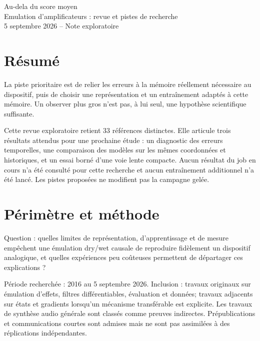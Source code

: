 \documentclass[10pt,a4paper]{article}
\begin{document}
\begin{center}\Large Au-dela du score moyen\\
\large Emulation d'amplificateurs : revue et pistes de recherche\\
\normalsize 5 septembre 2026 -- Note exploratoire\end{center}
\tableofcontents
\newpage


\section{R\'{e}sum\'{e}}

La piste prioritaire est de relier les erreurs \`{a} la m\'{e}moire r\'{e}ellement n\'{e}cessaire au dispositif,
puis de choisir une repr\'{e}sentation et un entra\^{i}nement adapt\'{e}s \`{a} cette m\'{e}moire.
Un observer plus gros n'est pas, \`{a} lui seul, une hypoth\`{e}se scientifique suffisante.

Cette revue exploratoire retient 33 r\'{e}f\'{e}rences distinctes. Elle articule trois r\'{e}sultats attendus
pour une prochaine \'{e}tude : un diagnostic des erreurs temporelles, une comparaison des mod\`{e}les sur
les m\^{e}mes coordonn\'{e}es et historiques, et un essai born\'{e} d'une voie lente compacte.
Aucun r\'{e}sultat du job en cours n'a \'{e}t\'{e} consult\'{e} pour cette recherche et aucun entra\^{i}nement additionnel
n'a \'{e}t\'{e} lanc\'{e}. Les pistes propos\'{e}es ne modifient pas la campagne gel\'{e}e.

\section{P\'{e}rim\`{e}tre et m\'{e}thode}

Question : quelles limites de repr\'{e}sentation, d'apprentissage et de mesure emp\^{e}chent une \'{e}mulation
dry/wet causale de reproduire fid\`{e}lement un dispositif analogique, et quelles exp\'{e}riences peu
co\^{u}teuses permettent de d\'{e}partager ces explications ?

P\'{e}riode recherch\'{e}e : 2016 au 5 septembre 2026. Inclusion : travaux originaux sur \'{e}mulation
d'effets, filtres diff\'{e}rentiables, \'{e}valuation et donn\'{e}es; travaux adjacents sur \'{e}tats et gradients
lorsqu'un m\'{e}canisme transf\'{e}rable est explicite. Les travaux de synth\`{e}se audio g\'{e}n\'{e}rale sont
class\'{e}s comme preuves indirectes. Pr\'{e}publications et communications courtes sont admises mais
ne sont pas assimil\'{e}es \`{a} des r\'{e}plications ind\'{e}pendantes.
\end{document}
